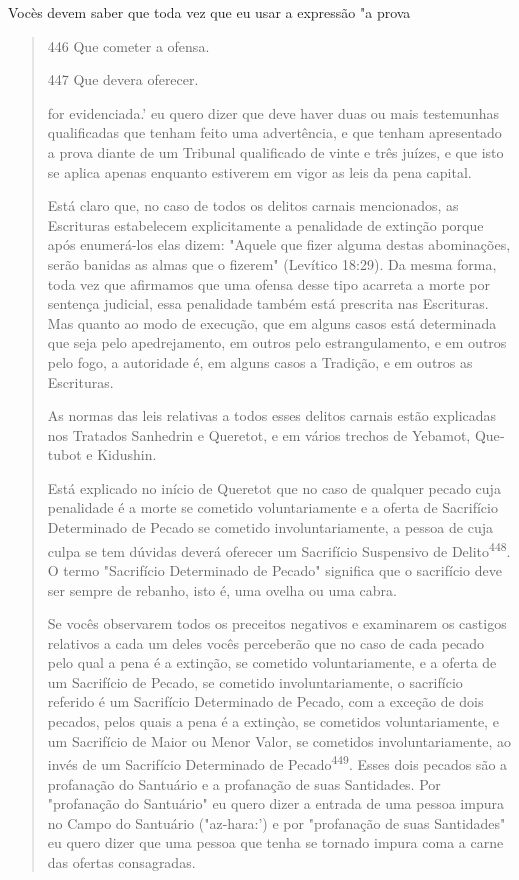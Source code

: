 Vocès devem saber que toda vez que eu usar a expressão "a prova

\begin{quote}
446 Que cometer a ofensa.

447 Que devera oferecer.


for evidenciada.' eu quero dizer que deve haver duas
ou mais testemunhas qua­lificadas que tenham feito uma advertência, e
que tenham apresentado a prova diante de um Tribunal qualificado de
vinte e três juízes, e que isto se aplica apenas enquanto estiverem em
vigor as leis da pena capital.

Está claro que, no caso de todos os delitos carnais mencionados, as
Escrituras estabelecem explicitamente a penalidade de extinção porque
após enumerá-los elas dizem: "Aquele que fizer alguma destas
abominações, serão banidas as almas que o fizerem" (Levítico 18:29). Da
mesma forma, toda vez que afirmamos que uma ofensa desse tipo acarreta a
morte por sentença judi­cial, essa penalidade também está prescrita nas
Escrituras. Mas quanto ao modo de execução, que em alguns casos está
determinada que seja pelo apedrejamento, em outros pelo estrangulamento,
e em outros pelo fogo, a autoridade é, em alguns casos a Tradição, e em
outros as Escrituras.

As normas das leis relativas a todos esses delitos carnais estão
expli­cadas nos Tratados Sanhedrin e Queretot, e em vários trechos de
Yebamot, Que­tubot e Kidushin.

Está explicado no início de Queretot que no caso de qualquer peca­do
cuja penalidade é a morte se cometido voluntariamente e a oferta de
Sacrifí­cio Determinado de Pecado se cometido involuntariamente, a
pessoa de cuja culpa se tem dúvidas deverá oferecer um Sacrifício
Suspensivo de Delito\textsuperscript{448}. O termo "Sacrifício
Determinado de Pecado" significa que o sacrifício deve ser sempre de
rebanho, isto é, uma ovelha ou uma cabra.

Se vocês observarem todos os preceitos negativos e examinarem os
castigos relativos a cada um deles vocês perceberão que no caso de cada
peca­do pelo qual a pena é a extinção, se cometido voluntariamente, e a
oferta de um Sacrifício de Pecado, se cometido involuntariamente, o
sacrifício referido é um Sacrifício Determinado de Pecado, com a exceção
de dois pecados, pelos quais a pena é a extinçào, se cometidos
voluntariamente, e um Sacrifício de Maior ou Menor Valor, se cometidos
involuntariamente, ao invés de um Sacri­fício Determinado de
Pecado\textsuperscript{449}. Esses dois pecados são a profanação do
San­tuário e a profanação de suas Santidades. Por "profanação do
Santuário" eu quero dizer a entrada de uma pessoa impura no Campo do
Santuário ("az-hara:') e por "profanação de suas Santidades" eu quero
dizer que uma pessoa que te­nha se tornado impura coma a carne das
ofertas consagradas.


\end{quote}

